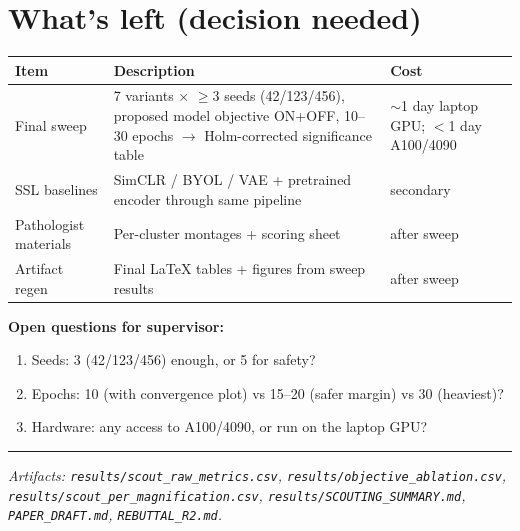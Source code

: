 \documentclass[11pt,a4paper]{article}
\begin{document}
\section{What's left (decision needed)}
\begin{center}
\begin{tabular}{@{}p{3cm}p{8cm}p{3.2cm}@{}}
\toprule
\textbf{Item} & \textbf{Description} & \textbf{Cost} \\
\midrule
Final sweep & 7 variants $\times$ $\geq$3 seeds (42/123/456), proposed model objective ON+OFF, 10--30 epochs $\rightarrow$ Holm-corrected significance table & $\sim$1 day laptop GPU; $<$1 day A100/4090 \\
SSL baselines & SimCLR / BYOL / VAE + pretrained encoder through same pipeline & secondary \\
Pathologist materials & Per-cluster montages + scoring sheet & after sweep \\
Artifact regen & Final LaTeX tables + figures from sweep results & after sweep \\
\bottomrule
\end{tabular}
\end{center}

\noindent\textbf{Open questions for supervisor:}
\begin{enumerate}[label=\arabic*.]
\item Seeds: 3 (42/123/456) enough, or 5 for safety?
\item Epochs: 10 (with convergence plot) vs 15--20 (safer margin) vs 30 (heaviest)?
\item Hardware: any access to A100/4090, or run on the laptop GPU?
\end{enumerate}

\vspace{6pt}\hrule\vspace{6pt}
\footnotesize\emph{Artifacts: \texttt{results/scout\_raw\_metrics.csv},
\texttt{results/objective\_ablation.csv}, \texttt{results/scout\_per\_magnification.csv},
\texttt{results/SCOUTING\_SUMMARY.md}, \texttt{PAPER\_DRAFT.md}, \texttt{REBUTTAL\_R2.md}.}
\end{document}

